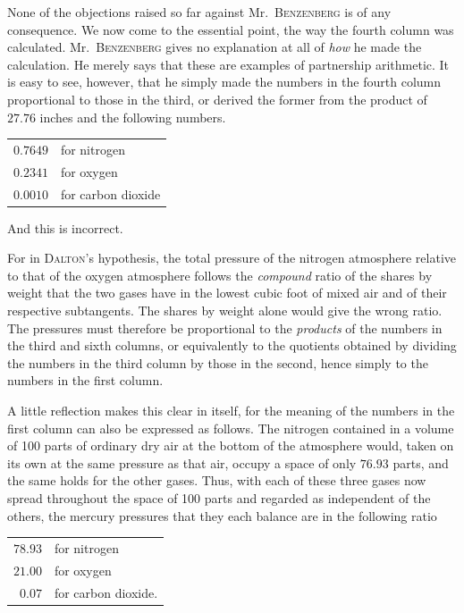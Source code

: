 None of the objections raised so far against Mr.\ \textsc{Benzenberg} is of any consequence. We now come to the essential point, the way the fourth column was calculated. Mr.\ \textsc{Benzenberg} gives no explanation at all of \textit{how} he made the calculation. He merely says that these are examples of partnership arithmetic. It is easy to see, however, that he simply made the numbers in the fourth column proportional to those in the third, or derived the former from the product of $27.76$ inches and the following numbers.
\begin{center}\begin{tabular}{rl}
$0.7649$ & for nitrogen\\
$0.2341$ & for oxygen\\
$0.0010$ & for carbon dioxide
\end{tabular}\end{center}

And this is incorrect.

For in \textsc{Dalton}’s hypothesis, the total pressure of the nitrogen atmosphere relative to that of the oxygen atmosphere follows the \textit{compound} ratio of the shares by weight that the two gases have in the lowest cubic foot of mixed air and of their respective subtangents. The shares by weight alone would give the wrong ratio. The pressures must therefore be proportional to the \textit{products} of the numbers in the third and sixth columns, or equivalently to the quotients obtained by dividing the numbers in the third column by those in the second, hence simply to the numbers in the first column.

A little reflection makes this clear in itself, for the meaning of the numbers in the first column can also be expressed as follows. The nitrogen contained in a volume of 100 parts of ordinary dry air at the bottom of the atmosphere would, taken on its own at the same pressure as that air, occupy a space of only $76.93$ parts, and the same
holds for the other gases. Thus, with each of these three gases now spread throughout the space of 100 parts and regarded as independent of the others, the mercury pressures that they each balance are in the following ratio
\begin{center}\begin{tabular}{rl}
$78.93$ & for nitrogen\\
$21.00$ & for oxygen\\
$0.07$ & for carbon dioxide.
\end{tabular}\end{center}

